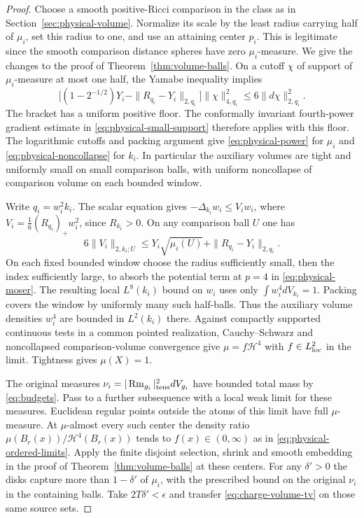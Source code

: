 \begin{proof}
Choose a smooth positive-Ricci comparison in the class as in
Section~\ref{sec:physical-volume}. Normalize its scale by the least
radius carrying half of \(\mu_i\), set this radius to one, and use an
attaining center \(p_i\). This is legitimate since the smooth
comparison distance spheres have zero \(\mu_i\)-measure.
We give the changes to the proof of Theorem~\ref{thm:volume-balls}.
On a cutoff \(\chi\) of support of \(\mu_i\)-measure at most one half,
the Yamabe inequality implies
\[
 \big[(1-2^{-1/2})Y_i-\|R_{q_i}-Y_i\|_{2,q_i}\big]
 \|\chi\|_{4,q_i}^2 \le 6\|d\chi\|_{2,q_i}^2.
\]
The bracket has a uniform positive floor. The conformally invariant
fourth-power gradient estimate in \eqref{eq:physical-small-support}
therefore applies with this floor. The logarithmic cutoffs and
packing argument give \eqref{eq:physical-power} for \(\mu_i\)
and \eqref{eq:physical-noncollapse} for \(k_i\). In particular
the auxiliary volumes are tight and uniformly small on small
comparison balls, with uniform noncollapse of comparison volume
on each bounded window.

Write \(q_i=w_i^2 k_i\). The scalar equation gives
\(-\Delta_{k_i}w_i\le V_iw_i\), where
\(V_i=\tfrac16(R_{q_i})_+ w_i^2\), since \(R_{k_i}>0\).
On any comparison ball \(U\) one has
\[
 6\|V_i\|_{2,k_i;U}\le Y_i\sqrt{\mu_i(U)}
                         +\|R_{q_i}-Y_i\|_{2,q_i}.
\]
On each fixed bounded window choose the radius sufficiently small,
then the index sufficiently large, to absorb the potential term at
\(p=4\) in \eqref{eq:physical-moser}. The resulting local
\(L^8(k_i)\) bound on \(w_i\) uses only
\(\int w_i^4dV_{k_i}=1\). Packing covers the window by uniformly
many such half-balls. Thus the auxiliary volume densities \(w_i^4\)
are bounded in \(L^2(k_i)\) there. Against compactly supported
continuous tests in a common pointed realization, Cauchy--Schwarz
and noncollapsed comparison-volume convergence give
\(\mu=f\mathcal H^4\) with \(f\in L^2_{\rm loc}\) in the limit.
Tightness gives \(\mu(X)=1\).

The original measures \(\nu_i=|\operatorname{Rm}_{g_i}|_{\rm tens}^2dV_{g_i}\)
have bounded total mass by \eqref{eq:budgets}. Pass to a further
subsequence with a local weak limit for these measures. Euclidean
regular points outside the atoms of this limit have full
\(\mu\)-measure. At \(\mu\)-almost every such center the density ratio
\(\mu(B_r(x))/\mathcal H^4(B_r(x))\) tends to \(f(x)\in(0,\infty)\)
as in
\eqref{eq:physical-ordered-limits}. Apply the finite disjoint selection,
shrink and smooth embedding in the proof of
Theorem~\ref{thm:volume-balls} at these centers. For any
\(\delta'>0\) the disks capture more than \(1-\delta'\) of \(\mu_i\),
with the prescribed bound on the original \(\nu_i\) in the containing
balls. Take \(2T\delta'<\epsilon\) and transfer
\eqref{eq:charge-volume-tv} on those same source sets.
\end{proof}

